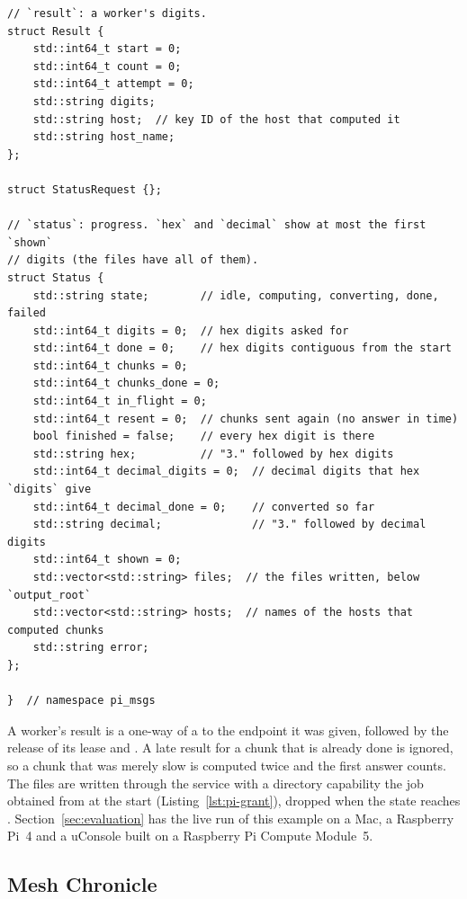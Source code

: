 \begin{lstlisting}[style=paglets-cpp,caption={Pi's messages: the job's parameters, a worker's task, a result and the status \src{cpp/examples/pi/pi\_msgs.hpp}},label={lst:app-pi-messages}]
// `result`: a worker's digits.
struct Result {
    std::int64_t start = 0;
    std::int64_t count = 0;
    std::int64_t attempt = 0;
    std::string digits;
    std::string host;  // key ID of the host that computed it
    std::string host_name;
};

struct StatusRequest {};

// `status`: progress. `hex` and `decimal` show at most the first `shown`
// digits (the files have all of them).
struct Status {
    std::string state;        // idle, computing, converting, done, failed
    std::int64_t digits = 0;  // hex digits asked for
    std::int64_t done = 0;    // hex digits contiguous from the start
    std::int64_t chunks = 0;
    std::int64_t chunks_done = 0;
    std::int64_t in_flight = 0;
    std::int64_t resent = 0;  // chunks sent again (no answer in time)
    bool finished = false;    // every hex digit is there
    std::string hex;          // "3." followed by hex digits
    std::int64_t decimal_digits = 0;  // decimal digits that hex `digits` give
    std::int64_t decimal_done = 0;    // converted so far
    std::string decimal;              // "3." followed by decimal digits
    std::int64_t shown = 0;
    std::vector<std::string> files;  // the files written, below `output_root`
    std::vector<std::string> hosts;  // names of the hosts that computed chunks
    std::string error;
};

}  // namespace pi_msgs
\end{lstlisting}

A worker's result is a one-way  of a  to the
endpoint it was given, followed by the release of its lease and
. A late result for a chunk that is already done is
ignored, so a chunk that was merely slow is computed twice and the first
answer counts. The files are written through the  service
with a directory capability the job obtained from  at the
start (Listing~\ref{lst:pi-grant}), dropped when the state reaches
. Section~\ref{sec:evaluation} has the live run of this
example on a Mac, a Raspberry Pi~4 and a uConsole built on a Raspberry
Pi Compute Module~5.

\subsection{Mesh Chronicle}\label{sec:examples-chronicle}

